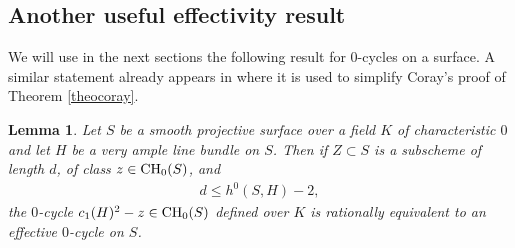 \documentclass[10pt]{article}
\newtheorem{lemm}[theo]{Lemma}
\begin{document}
\subsection{Another  useful effectivity result \label{secvbeff}}
We will use in the next sections  the following result for $0$-cycles on a surface. A similar statement already appears in \cite{colliot} where it is used to simplify Coray's proof of Theorem \ref{theocoray}.
\begin{lemm}\label{leeffective} Let $S$ be a smooth projective surface over a field $K$ of characteristic $0$ and let $H$ be a very ample line bundle on $S$. Then if $Z\subset S$ is a subscheme of length $d$, of class $z\in{\rm CH}_0(S)$, and
\begin{eqnarray}\label{eqineq} d\leq h^0(S,H)-2,
\end{eqnarray}
the $0$-cycle $c_1(H)^2-z\in {\rm CH}_0(S)$ defined over $K$ is rationally equivalent to an effective $0$-cycle on $S$.
\end{lemm}
\end{document}
